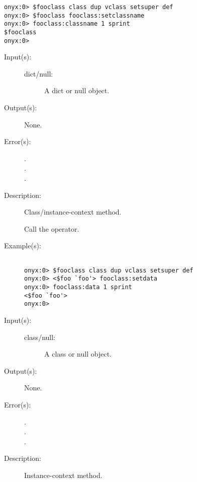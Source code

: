 \begin{description}
\begin{description}
\begin{verbatim}
onyx:0> $fooclass class dup vclass setsuper def
onyx:0> $fooclass fooclass:setclassname
onyx:0> fooclass:classname 1 sprint
$fooclass
onyx:0>
		\end{verbatim}
	\end{description}
\label{vclass:setdata}
\item[{\onyxop{dict/null}{setdata}{--}}: ]
	\begin{description}\item[]
	\item[Input(s): ]
		\begin{description}\item[]
		\item[dict/null: ]
			A dict or null object.
		\end{description}
	\item[Output(s): ] None.
	\item[Error(s): ]
		\begin{description}\item[]
		\item[.]
		\item[.]
		\item[.]
		\end{description}
	\item[Description: ]
		Class/instance-context method.

		Call the 
		operator.
	\item[Example(s): ]\begin{verbatim}

onyx:0> $fooclass class dup vclass setsuper def
onyx:0> <$foo `foo'> fooclass:setdata
onyx:0> fooclass:data 1 sprint
<$foo `foo'>
onyx:0>
		\end{verbatim}
	\end{description}
\label{vclass:setisa}
\item[{\onyxop{class/null}{setisa}{--}}: ]
	\begin{description}\item[]
	\item[Input(s): ]
		\begin{description}\item[]
		\item[class/null: ]
			A class or null object.
		\end{description}
	\item[Output(s): ] None.
	\item[Error(s): ]
		\begin{description}\item[]
		\item[.]
		\item[.]
		\item[.]
		\end{description}
	\item[Description: ]
		Instance-context method.


\end{description}
\end{description}
